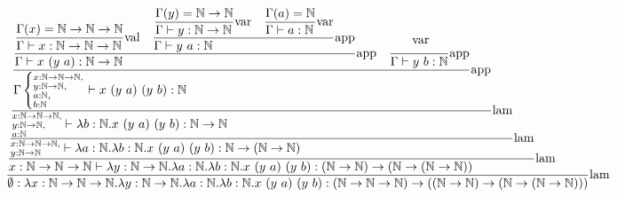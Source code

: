 \documentclass{article}
\begin{document}
\begin{landscape}
    \begin{align*}
        \st[lam]{
            \emptyset: \lam{x:\N\to \N\to \N}{\lam{y:\N\to \N}{\lam{a:\N}{\lam{b:\N}{x\ (y\ a)\ (y\ b)}}}}:(\N\to\N\to\N)\to((\N\to\N)\to(\N\to(\N\to\N)))
        }{
            \st[lam]{
                x:\N\to\N\to\N\vdash \lam{y:\N\to \N}{\lam{a:\N}{\lam{b:\N}{x\ (y\ a)\ (y\ b)}}} : (\N\to\N)\to(\N\to(\N\to\N))
            }{
                \st[lam]{
                    \substack{x:\N\to\N\to\N,\hfill\\y:\N\to\N\hfill}\vdash \lam{a:\N}{\lam{b:\N}{x\ (y\ a)\ (y\ b)}}:\N\to(\N\to\N)
                }{
                    \st[lam] {
                        \substack{x:\N\to\N\to\N,\hfill\\y:\N\to\N,\hfill\\a:\N\hfill}\vdash \lam{b:\N}{x\ (y\ a)\ (y\ b)}:\N\to\N
                    }{
                        \st[app] {
                            \Gamma \left\{\substack{x:\N\to\N\to\N,\hfill\\y:\N\to\N,\hfill\\a:\N,\hfill\\b:\N\hfill}\right.\vdash x\ (y\ a)\ (y\ b):\N
                        }{
                            \st[app]{
                                \Gamma\vdash x\ (y\ a): \N\to\N
                            }{
                                \st[val]{
                                    \Gamma\vdash x:\N\to\N\to\N
                                }{
                                    \Gamma(x)=\N\to\N\to\N
                                }
                                \quad
                                \st[app]{
                                    \Gamma\vdash y\ a:\N
                                }{
                                    \st[var]{
                                        \Gamma\vdash y:\N\to\N
                                    }{
                                        \Gamma(y)=\N\to\N
                                    }
                                    \quad
                                    \st[var]{
                                        \Gamma\vdash a:\N
                                    }{
                                        \Gamma(a)=\N
                                    }
                                }
                            }
                            \quad
                            \st[app]{
                                \Gamma\vdash y\ b:\N
                            }{
                                \st[var]{
}}}}}}}
\end{align*}
\end{landscape}
\end{document}
